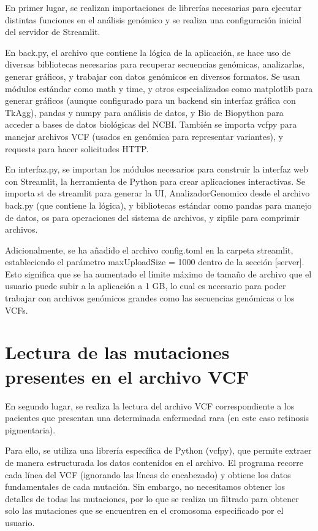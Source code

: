 \documentclass[11pt,spanish,listoffigures,listoftables]{tfgetsinf}
\begin{document}
En primer lugar, se realizan importaciones de librerías necesarias para ejecutar distintas funciones en el análisis genómico y se realiza una configuración inicial del servidor de Streamlit. 

En back.py, el archivo que contiene la lógica de la aplicación, se hace uso de diversas bibliotecas necesarias para recuperar secuencias genómicas, analizarlas, generar gráficos, y trabajar con datos genómicos en diversos formatos. Se usan módulos estándar como math y time, y otros especializados como matplotlib para generar gráficos (aunque configurado para un backend sin interfaz gráfica con TkAgg), pandas y numpy para análisis de datos, y Bio de Biopython para acceder a bases de datos biológicas del \ac{NCBI}. También se importa vcfpy para manejar archivos \ac{VCF} (usados en genómica para representar variantes), y requests para hacer solicitudes HTTP. 

En interfaz.py, se importan los módulos necesarios para construir la interfaz web con Streamlit, la herramienta de Python para crear aplicaciones interactivas. Se importa st de streamlit para generar la UI, AnalizadorGenomico desde el archivo back.py (que contiene la lógica), y bibliotecas estándar como pandas para manejo de datos, os para operaciones del sistema de archivos, y zipfile para comprimir archivos.  

Adicionalmente, se ha añadido el archivo config.toml en la carpeta streamlit, estableciendo el parámetro maxUploadSize = 1000 dentro de la sección [server]. Esto significa que se ha aumentado el límite máximo de tamaño de archivo que el usuario puede subir a la aplicación a 1 GB, lo cual es necesario para poder trabajar con archivos genómicos grandes como las secuencias genómicas o los \ac{VCF}s. 


\section{Lectura de las mutaciones presentes en el archivo \ac{VCF}}

En segundo lugar, se realiza la lectura del archivo \ac{VCF} correspondiente a los pacientes que presentan una determinada enfermedad rara (en este caso retinosis pigmentaria). 

Para ello, se utiliza una librería específica de Python (vcfpy), que permite extraer de manera estructurada los datos contenidos en el archivo. El programa recorre cada línea del \ac{VCF} (ignorando las líneas de encabezado) y obtiene los datos fundamentales de cada mutación. Sin embargo, no necesitamos obtener los detalles de todas las mutaciones, por lo que se realiza un filtrado para obtener solo las mutaciones que se encuentren en el cromosoma especificado por el usuario. 
\end{document}
